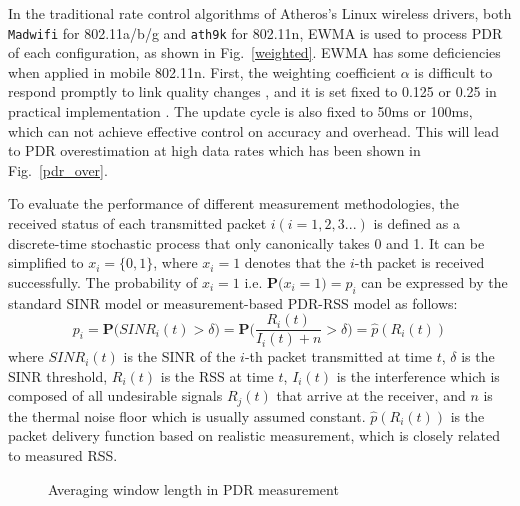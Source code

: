 \documentclass[draftclsnofoot,journal,onecolumn,11pt]{IEEEtran}
\begin{document}
In the traditional rate control algorithms of Atheros's Linux wireless drivers, both \texttt{Madwifi} for 802.11a/b/g and \texttt{ath9k} \cite{ath9k} for 802.11n, EWMA is used to process PDR of each configuration, as shown in Fig.~\ref{weighted}. EWMA has some deficiencies when applied in mobile 802.11n. First, the weighting coefficient $\alpha$ is difficult to respond promptly to link quality changes \cite{EWMAChart}, and it is set fixed to 0.125 or 0.25 in practical implementation \cite{ath9k} \cite{minstrel}. The update cycle is also fixed to 50ms or 100ms, which can not achieve effective control on accuracy and overhead. This will lead to PDR overestimation at high data rates which has been shown in Fig.~\ref{pdr_over}.

To evaluate the performance of different measurement methodologies, the received status of each transmitted packet $i(i=1,2,3...)$ is defined as a discrete-time stochastic process that only canonically takes 0 and 1. It can be simplified to $x_i=\{0,1\}$, where $x_i=1$ denotes that the $i$-th packet is received successfully. The probability of $x_i=1$ i.e. $\textbf{P(}x_i=1\textbf{)}=p_i$ can be expressed by the standard SINR model or measurement-based PDR-RSS model as follows:
\begin{equation}
 p_i=\textbf{P(}SINR_i(t)>\delta\textbf{)}=\textbf{P(}\frac{R_i(t)}{I_i(t)+n}>\delta\textbf{)}=\hat{p}(R_i(t))
\label{p_i}
\end{equation}
where $SINR_i(t)$ is the SINR of the $i$-th packet transmitted at time $t$, $\delta$ is the SINR threshold, $R_i(t)$ is the RSS at time $t$, $I_i(t)$ is the interference which is composed of all undesirable signals $R_j(t)$ that arrive at the receiver, and $n$ is the thermal noise floor which is usually assumed constant. $\hat{p}(R_i(t))$ is the packet delivery function based on realistic measurement, which is closely related to measured RSS.

\begin{figure}[!t]
\centerline{
}
\caption{Averaging window length in PDR measurement}
\label{method}
\end{figure}
\end{document}
